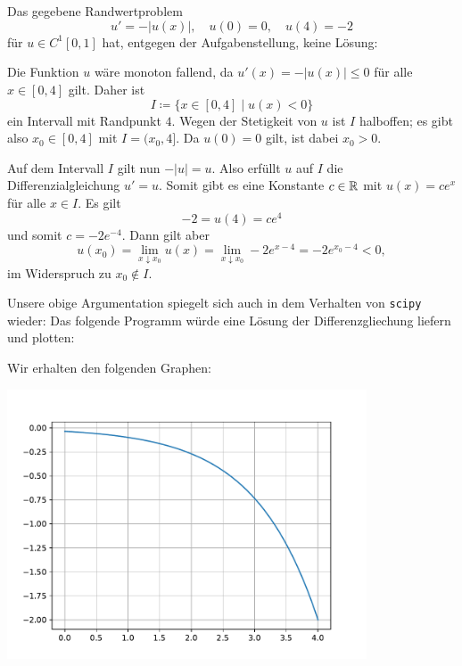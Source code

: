 \section{}

Das gegebene Randwertproblem
\[
        u' = -|u(x)|,
  \quad u(0) =  0,
  \quad u(4) = -2
\]
für $u \in C^1[0,1]$ hat, entgegen der Aufgabenstellung, keine Lösung:

Die Funktion $u$ wäre monoton fallend, da $u'(x) = -|u(x)| \leq 0$ für alle $x \in [0,4]$ gilt.
Daher ist
\[
            I
  \coloneqq \{
              x \in [0,4]
            \mid
              u(x) < 0
            \}
\]
ein Intervall mit Randpunkt $4$.
Wegen der Stetigkeit von $u$ ist $I$ halboffen;
es gibt also $x_0 \in [0,4]$ mit $I = (x_0, 4]$.
Da $u(0) = 0$ gilt, ist dabei $x_0 > 0$.

Auf dem Intervall $I$ gilt nun $-|u| = u$.
Also erfüllt $u$ auf $I$ die Differenzialgleichung $u' = u$.
Somit gibt es eine Konstante $c \in \mathbb{R}$ mit $u(x) = c e^x$ für alle $x \in I$.
Es gilt
\[
    -2
  = u(4)
  = c e^4
\]
und somit $c = -2 e^{-4}$.
Dann gilt aber
\[
    u(x_0)
  = \lim_{x \downarrow x_0} u(x)
  = \lim_{x \downarrow x_0} -2 e^{x-4}
  = -2 e^{x_0-4}
  < 0,
\]
im Widerspruch zu $x_0 \notin I$.

Unsere obige Argumentation spiegelt sich auch in dem Verhalten von \texttt{scipy} wieder:
Das folgende Programm würde eine Lösung der Differenzgliechung liefern und plotten:



Wir erhalten den folgenden Graphen:

\begin{center}
  \includegraphics[width = 0.8\textwidth]{chapter_04/exercise_04_22_figure_1.pdf}
\end{center}

